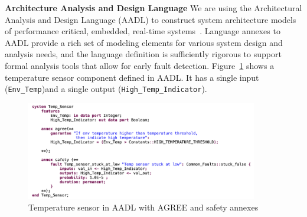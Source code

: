 
\textbf{Architecture Analysis and Design Language}
We are using the Architectural Analysis and Design Language (AADL) to construct system architecture models of performance critical, embedded, real-time systems~\cite{AADL_Standard,FeilerModelBasedEngineering2012}. %
Language annexes to AADL provide a rich set of modeling elements for various system design and analysis needs, and the language definition is sufficiently rigorous to support formal analysis tools that allow for early fault detection. Figure~\ref{fig:tempSensor} shows a temperature sensor component defined in AADL. It has a single input \small(\texttt{Env\_Temp})\normalsize and a single output \small(\texttt{High\_Temp\_Indicator})\normalsize.  

\begin{figure}[h!]
	\begin{center}
		\includegraphics[width=0.9\textwidth]{images/tempSensoraadlannex.png}
	\end{center}
	\caption{Temperature sensor in AADL with AGREE and safety annexes}
	\label{fig:tempSensor}
\end{figure}

